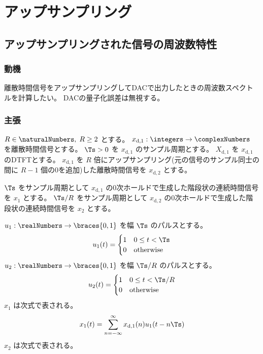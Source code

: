 \chapter{アップサンプリング}
    \section{アップサンプリングされた信号の周波数特性}
        \newcommand{\xda}{x_{\text{d},1}}
        \newcommand{\Xda}{X_{\text{d},1}}
        \newcommand{\xdb}{x_{\text{d},2}}
        \subsection{動機}
            離散時間信号をアップサンプリングしてDACで出力したときの周波数スペクトルを計算したい。
            DACの量子化誤差は無視する。
        \subsection{主張}
            $R\in\naturalNumbers,\;R\geq 2$ とする。
            $\xda:\integers\to\complexNumbers$ を離散時間信号とする。
            $\Ts>0$ を $\xda$ のサンプル周期とする。
            $\Xda$ を $\xda$ のDTFTとする。
            $\xda$ を $R$ 倍にアップサンプリング(元の信号のサンプル同士の間に $R-1$ 個の0を追加)した離散時間信号を $\xdb$ とする。
            \par
            $\Ts$ をサンプル周期として $\xda$ の0次ホールドで生成した階段状の連続時間信号を $x_1$ とする。
            $\Ts/R$ をサンプル周期として $\xdb$ の0次ホールドで生成した階段状の連続時間信号を $x_2$ とする。
            \par
            $u_1:\realNumbers\to\braces{0,1}$ を幅 $\Ts$ のパルスとする。
            \[
                u_1(t) = \begin{cases}
                    1 & 0\leq t < \Ts \\
                    0 & \text{otherwise}
                \end{cases}
            \]
            $u_2:\realNumbers\to\braces{0,1}$ を幅 $\Ts/R$ のパルスとする。
            \[
                u_2(t) = \begin{cases}
                    1 & 0\leq t < \Ts/R \\
                    0 & \text{otherwise}
                \end{cases}
            \]
            $x_1$ は次式で表される。
            \[ x_1(t) = \sum_{n=-\infty}^\infty \xda(n)u_1(t-n\Ts) \]
            $x_2$ は次式で表される。

